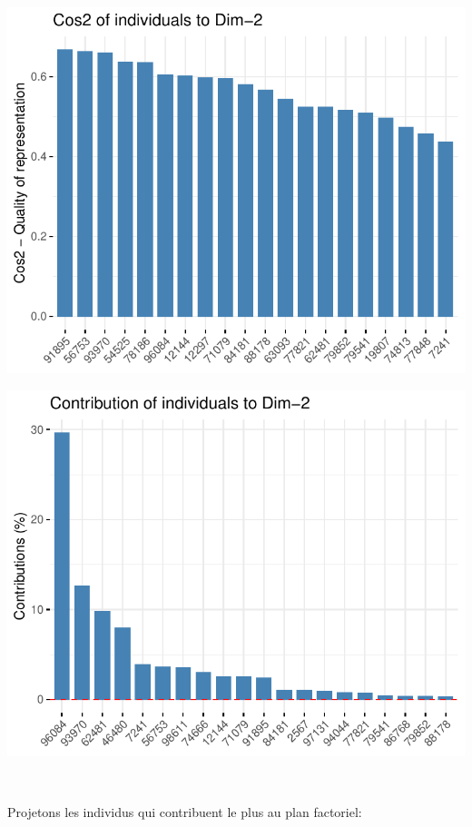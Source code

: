 \documentclass[]{imsart}
\numberwithin{equation}{section}
\theoremstyle{plain}
\begin{document}
\begin{flushleft}\includegraphics{Analyse_Exploratoire_Projet_files/figure-latex/unnamed-chunk-18-3} \end{flushleft}

\begin{flushleft}\includegraphics{Analyse_Exploratoire_Projet_files/figure-latex/unnamed-chunk-18-4} \end{flushleft}

~

Projetons les individus qui contribuent le plus au plan factoriel:
\end{document}
